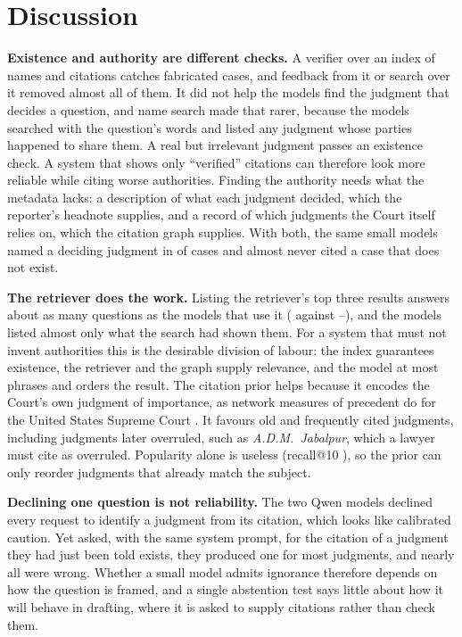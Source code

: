 \section{Discussion}
\label{sec:discussion}

\textbf{Existence and authority are different checks.} A verifier over an index of names and citations catches fabricated cases, and feedback from it or search over it removed almost all of them. It did not help the models find the judgment that decides a question, and name search made that rarer, because the models searched with the question's words and listed any judgment whose parties happened to share them. A real but irrelevant judgment passes an existence check. A system that shows only ``verified'' citations can therefore look more reliable while citing worse authorities. Finding the authority needs what the metadata lacks: a description of what each judgment decided, which the reporter's headnote supplies, and a record of which judgments the Court itself relies on, which the citation graph supplies. With both, the same small models named a deciding judgment in \RefAllTopicPrior{} of \RefQuestionsAll{} cases and almost never cited a case that does not exist.

\textbf{The retriever does the work.} Listing the retriever's top three results answers about as many questions as the models that use it (\QHybridPriorHitThree{} against \RefTopicPriorGemma--\RefTopicPriorLlama), and the models listed almost only what the search had shown them. For a system that must not invent authorities this is the desirable division of labour: the index guarantees existence, the retriever and the graph supply relevance, and the model at most phrases and orders the result. The citation prior helps because it encodes the Court's own judgment of importance, as network measures of precedent do for the United States Supreme Court \cite{fowler2007}. It favours old and frequently cited judgments, including judgments later overruled, such as \emph{A.D.M.\ Jabalpur}, which a lawyer must cite as overruled. Popularity alone is useless (recall@10 \RecPopRTen), so the prior can only reorder judgments that already match the subject.

\textbf{Declining one question is not reliability.} The two Qwen models declined every request to identify a judgment from its citation, which looks like calibrated caution. Yet asked, with the same system prompt, for the citation of a judgment they had just been told exists, they produced one for most judgments, and nearly all were wrong. Whether a small model admits ignorance therefore depends on how the question is framed, and a single abstention test says little about how it will behave in drafting, where it is asked to supply citations rather than check them.

